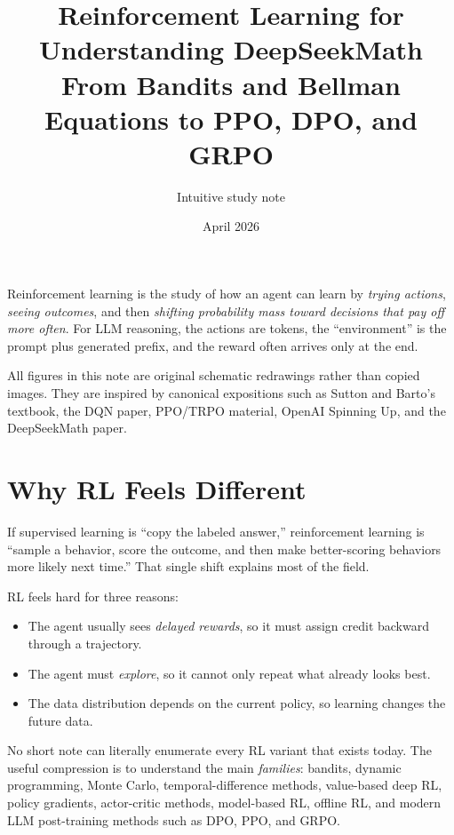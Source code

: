 \documentclass[11pt]{article}
\title{Reinforcement Learning for Understanding DeepSeekMath\\
\large From Bandits and Bellman Equations to PPO, DPO, and GRPO}
\author{Intuitive study note}
\date{April 2026}
\begin{document}
\maketitle

\begin{intuitionbox}
Reinforcement learning is the study of how an agent can learn by \emph{trying actions}, \emph{seeing outcomes}, and then \emph{shifting probability mass toward decisions that pay off more often}. For LLM reasoning, the actions are tokens, the ``environment'' is the prompt plus generated prefix, and the reward often arrives only at the end.
\end{intuitionbox}

\begin{center}
\small All figures in this note are original schematic redrawings rather than copied images. They are inspired by canonical expositions such as Sutton and Barto's textbook, the DQN paper, PPO/TRPO material, OpenAI Spinning Up, and the DeepSeekMath paper.
\end{center}

\tableofcontents

\section{Why RL Feels Different}

If supervised learning is ``copy the labeled answer,'' reinforcement learning is ``sample a behavior, score the outcome, and then make better-scoring behaviors more likely next time.'' That single shift explains most of the field.

RL feels hard for three reasons:

\begin{itemize}
  \item The agent usually sees \emph{delayed rewards}, so it must assign credit backward through a trajectory.
  \item The agent must \emph{explore}, so it cannot only repeat what already looks best.
  \item The data distribution depends on the current policy, so learning changes the future data.
\end{itemize}

\begin{takeawaybox}
No short note can literally enumerate every RL variant that exists today. The useful compression is to understand the main \emph{families}: bandits, dynamic programming, Monte Carlo, temporal-difference methods, value-based deep RL, policy gradients, actor-critic methods, model-based RL, offline RL, and modern LLM post-training methods such as DPO, PPO, and GRPO.
\end{takeawaybox}
\end{document}
